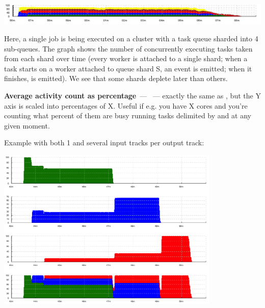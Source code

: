 \documentclass{article}
\begin{document}
\centerline{\includegraphics[width=\textwidth]{pics/tplot/tplot-4rmq.png}}

Here, a single job is being executed on a cluster with a task queue sharded into 4 sub-queues. The graph shows the number of concurrently executing tasks taken from each shard over time (every worker is attached to a single shard; when a task starts on a worker attached to queue shard S, an event  is emitted; when it finishes,  is emitted). We see that some shards deplete later than others.


\pagebreak
\noindent
\textbf{Average activity count as percentage}~--- ~--- exactly the same as , but the Y axis is scaled into percentages of X. Useful if e.g. you have X cores and you're counting what percent of them are busy running tasks delimited by \hlverb{>} and \hlverb{<} at any given moment.

Example with both 1 and several input tracks per output track: 

\centerline{\includegraphics[width=0.8\textwidth]{pics/tplot/tplot-three-jobs.png}}
\end{document}
